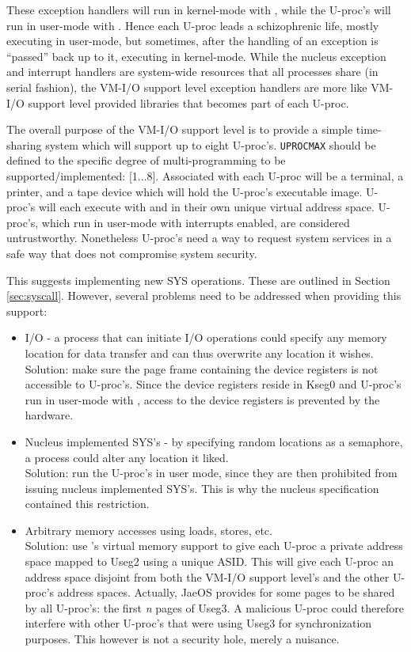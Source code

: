 These exception handlers will run in kernel-mode with \vmon{}, while the U-proc's will run in user-mode with \vmon{}. Hence each U-proc leads a schizophrenic life, mostly executing in user-mode, but sometimes, after the handling of an exception is ``passed'' back up to it, executing in kernel-mode.
While the nucleus exception and interrupt handlers are system-wide resources that all processes share (in serial fashion), the VM-I/O support level exception handlers are more like VM-I/O support level provided libraries that becomes part of each U-proc.

The overall purpose of the VM-I/O support level is to provide a simple time-sharing system which will support up to eight U-proc's.
\verb+UPROCMAX+ should be defined to the specific degree of multi-programming to be supported/implemented: [1...8].
Associated with each U-proc will be a terminal, a printer, and a tape device which will hold the U-proc's executable image. U-proc's will each execute with \vmon{} and in their own unique virtual address space.
U-proc's, which run in user-mode with interrupts enabled, are considered untrustworthy.
Nonetheless U-proc's need a way to request system services in a safe way that does not compromise system security.

This suggests implementing new SYS operations. These are outlined in Section \ref{sec:syscall}. However, several problems need to be addressed when providing this support:
\begin{itemize}
\item I/O - a process that can initiate I/O operations could specify any memory location for data transfer and can thus overwrite any location it wishes. \\
Solution: make sure the page frame containing the device registers is not accessible to U-proc's. Since the device registers reside in Kseg0 and U-proc's run in user-mode with \vmon{}, access to the device registers is prevented by the hardware.
\item Nucleus implemented SYS's - by specifying random locations as a semaphore, a process could alter any location it liked. \\
Solution: run the U-proc's in user mode, since they are then prohibited from issuing nucleus implemented SYS's. This is why the nucleus specification contained this restriction.
\item Arbitrary memory accesses using loads, stores, etc. \\
Solution: use \uarm{}'s virtual memory support to give each U-proc a private address space mapped to Useg2 using a unique ASID. This will give each U-proc an address space disjoint from both the VM-I/O support level's and the other U-proc's address spaces. Actually, JaeOS provides for some pages to be shared by all U-proc's: the first \emph{n} pages of Useg3. A malicious U-proc could therefore interfere with other U-proc's that were using Useg3 for synchronization purposes. This however is not a security hole, merely a nuisance.
\end{itemize}

